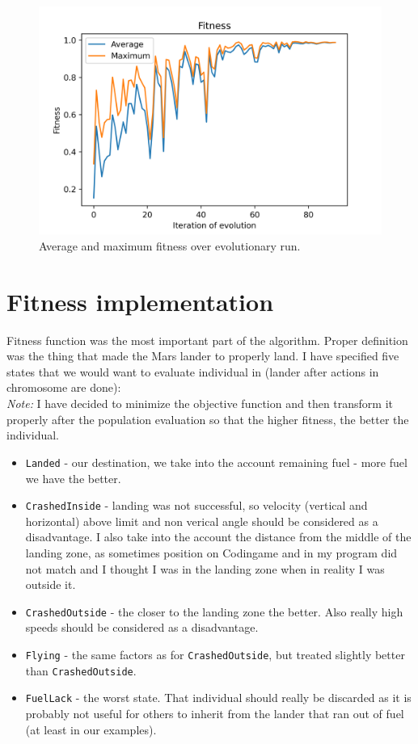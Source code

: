 \documentclass[11pt]{article}
\begin{document}
	\begin{figure}[h]
 	\centering
	\includegraphics[scale=1.0]{plots/plot} 	
	\caption{Average and maximum fitness over evolutionary run.}
 	\end{figure}
	
	\section{Fitness implementation}
	Fitness function was the most important part of the algorithm. Proper definition was the thing that made the Mars lander to properly land. I have specified five states that we would want to evaluate individual in (lander after actions in chromosome are done):\\
	
	\textit{Note:} I have decided to minimize the objective function and then transform it properly after the population evaluation so that the higher fitness, the better the individual.
		
	\begin{itemize}
		\item \texttt{Landed} - our destination, we take into the account remaining fuel - more fuel we have the better.
		\item \texttt{CrashedInside} - landing was not successful, so velocity (vertical and horizontal) above limit and non verical angle should be considered as a disadvantage. I also take into the account the distance from the middle of the landing zone, as sometimes position on Codingame and in my program did not match and I thought I was in the landing zone when in reality I was outside it.
		\item \texttt{CrashedOutside} - the closer to the landing zone the better. Also really high speeds should be considered as a disadvantage.
		\item \texttt{Flying} - the same factors as for \texttt{CrashedOutside}, but treated slightly better than \texttt{CrashedOutside}.
		\item \texttt{FuelLack} - the worst state. That individual should really be discarded as it is probably not useful for others to inherit from the lander that ran out of fuel (at least in our examples).
	\end{itemize}
	
\end{document}
